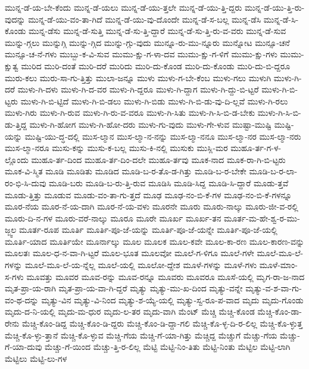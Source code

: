 {ಮುನ್ನ-ಡೆ-ಯ-ಬೇ-ಕೆಂದು
ಮುನ್ನ-ಡೆ-ಯಲು
ಮುನ್ನ-ಡೆ-ಯು-ತ್ತಲೇ
ಮುನ್ನ-ಡೆ-ಯು-ತ್ತಿ-ದ್ದರು
ಮುನ್ನ-ಡೆ-ಯು-ತ್ತಿ-ರು-ವುದನ್ನು
ಮುನ್ನ-ಡೆ-ಯು-ವಂ-ತಾ-ಗಿದೆ
ಮುನ್ನ-ಡೆ-ಯು-ವು-ದೊಂದೇ
ಮುನ್ನ-ಡೆ-ಸ-ಬಲ್ಲ
ಮುನ್ನ-ಡೆಸಿ
ಮುನ್ನ-ಡೆ-ಸಿ-ಕೊಂಡು
ಮುನ್ನ-ಡೆಸು
ಮುನ್ನ-ಡೆ-ಸುತ್ತಿ
ಮುನ್ನ-ಡೆ-ಸು-ತ್ತಿ-ದ್ದಾರೆ
ಮುನ್ನ-ಡೆ-ಸು-ತ್ತಿ-ರು-ವ-ವರು
ಮುನ್ನ-ಡೆ-ಸುವ
ಮುನ್ನು-ಗ್ಗಲು
ಮುನ್ನುಗ್ಗಿ
ಮುನ್ನು-ಗ್ಗಿದ
ಮುನ್ನು-ಗ್ಗು-ವುದು
ಮುನ್ನೂ-ರು-ಮು-ನ್ನೂರು
ಮುನ್ನೋಟ
ಮುನ್ಸೂ-ಚನೆ
ಮುನ್ಸೂ-ಚ-ನೆ-ಗಳು
ಮುಬ್ಬು-ಕ-ವಿ-ಸುವ
ಮುಮು-ಕ್ಷು-ಗ-ಳಾ-ದವ
ಮುಮು-ಕ್ಷು-ಗ-ಳಿಗೆ
ಮುಮು-ಕ್ಷು-ಗಳು
ಮುಮು-ಕ್ಷುತ್ವ
ಮುರಿದ
ಮುರಿ-ದಂತೆ
ಮುರಿ-ದರೆ
ಮುರಿದು
ಮುರಿ-ದು-ಕೊಂಡ
ಮುರಿ-ದು-ಕೊಂಡು
ಮುರಿ-ದು-ಬಿ-ದ್ದರೂ
ಮುರು-ಕಲು
ಮುರು-ಸಾ-ಗು-ತ್ತಿತ್ತು
ಮುಲಾ-ಜನ್ನೂ
ಮುಳು
ಮುಳು-ಗ-ಬೇ-ಕೆಂಬ
ಮುಳು-ಗಲು
ಮುಳುಗಿ
ಮುಳು-ಗಿ-ದರೆ
ಮುಳು-ಗಿ-ದಳು
ಮುಳು-ಗಿ-ದ-ವರ
ಮುಳು-ಗಿ-ದ್ದರೂ
ಮುಳು-ಗಿ-ದ್ದಾಗ
ಮುಳು-ಗಿ-ದ್ದು-ಬಿ-ಟ್ಟರೆ
ಮುಳು-ಗಿ-ಬಿ-ಟ್ಟರು
ಮುಳು-ಗಿ-ಬಿ-ಟ್ಟಿದೆ
ಮುಳು-ಗಿ-ಬಿ-ಡಲು
ಮುಳು-ಗಿ-ಬಿಡು
ಮುಳು-ಗಿ-ಬಿ-ಡು-ವು-ದಿ-ಲ್ಲವೆ
ಮುಳು-ಗಿ-ರಲು
ಮುಳು-ಗಿರು
ಮುಳು-ಗಿ-ರುವ
ಮುಳು-ಗಿ-ರು-ವ-ವರೂ
ಮುಳು-ಗಿ-ಸಿತು
ಮುಳು-ಗಿ-ಸಿ-ಬಿ-ಡ-ಬೇಕು
ಮುಳು-ಗಿ-ಸಿ-ಬಿ-ಡು-ತ್ತಿದ್ದ
ಮುಳು-ಗಿ-ಹೋಗ
ಮುಳು-ಗಿ-ಹೋ-ದರು
ಮುಳು-ಗು-ವುದು
ಮುಳು-ಗೇ-ಳುವ
ಮುಷ್ಟಾ-ಮುಷ್ಟಿ
ಮುಷ್ಟಿ-ಯನ್ನು
ಮುಷ್ಟಿ-ಯು-ದ್ಧ-ದಲ್ಲಿ
ಮುಸ-ಲ್ಮಾನ
ಮುಸ-ಲ್ಮಾ-ನ-ನನ್ನು
ಮುಸ-ಲ್ಮಾ-ನನೂ
ಮುಸ-ಲ್ಮಾ-ನರ
ಮುಸ-ಲ್ಮಾ-ನರು
ಮುಸ-ಲ್ಮಾ-ನರೂ
ಮುಸು-ಕನ್ನು
ಮುಸು-ಕ-ಬಲ್ಲ
ಮುಸು-ಕಿ-ನಲ್ಲಿ
ಮುಸುಕು
ಮುಸ್ಲಿ-ಮರ
ಮುಹೂ-ರ್ತ-ಗ-ಳ-ಲ್ಲೊಂದು
ಮುಹೂ-ರ್ತ-ದಿಂದ
ಮುಹೂ-ರ್ತ-ದಿಂ-ದಲೇ
ಮುಹೂ-ರ್ತವು
ಮೂಕ-ನಾದ
ಮೂಕ-ರಾ-ಗಿ-ಬಿ-ಟ್ಟರು
ಮೂಕ-ವಿ-ಸ್ಮಿತ
ಮೂಡಿ
ಮೂಡಿತು
ಮೂಡಿದ
ಮೂಡಿ-ಬ-ರ-ತೊ-ಡ-ಗಿತ್ತು
ಮೂಡಿ-ಬ-ರ-ಬೇಕೇ
ಮೂಡಿ-ಬ-ರ-ಲಾ-ರಂ-ಭಿ-ಸಿ-ದುವು
ಮೂಡಿ-ಬರು
ಮೂಡಿ-ಬ-ರು-ತ್ತಿ-ರುವ
ಮೂಡಿಸಿ
ಮೂಡಿ-ಸಿದ್ದ
ಮೂಡಿ-ಸಿ-ದ್ದಾರೆ
ಮೂಡು-ತ್ತವೆ
ಮೂಡು-ತ್ತಿತ್ತು
ಮೂಡುವ
ಮೂಡು-ವಂ-ತಾ-ಗು-ತ್ತದೆ
ಮೂಢ
ಮೂಢ-ನಂ-ಬಿ-ಕೆ-ಗಳ
ಮೂಢ-ನಂ-ಬಿ-ಕೆ-ಗಳನ್ನೂ
ಮೂರ-ನೆಯ
ಮೂರ-ನೆ-ಯ-ದಾಗಿ
ಮೂರ-ನೆ-ಯ-ವಳು
ಮೂರನೇ
ಮೂರು
ಮೂರು-ನಾಲ್ಕು
ಮೂರು-ಜೀ-ವ-ರಲ್ಲಿ
ಮೂರು-ದಿ-ನ-ಗಳ
ಮೂರು-ವರೆ-ನಾಲ್ಕು
ಮೂರೂ
ಮೂರೇ
ಮೂರ್ಖ
ಮೂರ್ಖ-ತನ
ಮೂರ್ತ-ಮ-ಹೇ-ಶ್ವ-ರ-ಮು-ಜ್ಜ್ವಲ
ಮೂರ್ತ-ರೂಪ
ಮೂರ್ತಿ
ಮೂರ್ತಿ-ಪೂ-ಜೆ-ಯನ್ನು
ಮೂರ್ತಿ-ಪೂ-ಜೆ-ಯನ್ನೇ
ಮೂರ್ತಿ-ಪೂ-ಜೆ-ಯಲ್ಲಿ
ಮೂರ್ತಿ-ಯಾದ
ಮೂರ್ತಿಯೇ
ಮೂರ್ನಾಲ್ಕು
ಮೂಲ
ಮೂಲಕ
ಮೂಲ-ಕವೇ
ಮೂಲ-ಕಾ-ರಣ
ಮೂಲ-ಕಾರಣ-ವನ್ನು
ಮೂಲತಃ
ಮೂಲ-ಧ-ನ-ವಾ-ಗಿ-ಟ್ಟರೆ
ಮೂಲ-ಭೂತ
ಮೂಲವೋ
ಮೂಲೆ-ಗ-ಳಿಗೂ
ಮೂಲೆ-ಗಳೇ
ಮೂಲೆ-ಮೂ-ಲೆ-ಗಳನ್ನು
ಮೂಲೆ-ಮೂ-ಲೆ-ಯ-ನ್ನೆಲ್ಲ
ಮೂಲೆ-ಯಲ್ಲಿ
ಮೂಲೋ-ದ್ದೇಶ
ಮೂಳೆ-ಗಳನ್ನು
ಮೂಳೆ-ಗಳು
ಮೂಳೆ-ಮಾಂ-ಸ-ಗಳು
ಮೂವತ್ತು
ಮೂವರ
ಮೂವ-ರನ್ನು
ಮೂವ-ರನ್ನೂ
ಮೂವರು
ಮೂವರೂ
ಮೂಸೆ-ಯಲ್ಲಿ
ಮೃಗ-ರಾ-ಜ-ನಾದ
ಮೃತ-ಪ್ರಾ-ಯ-ರಾಗಿ
ಮೃತ-ಪ್ರಾ-ಯ-ವಾ-ಗಿ-ದ್ದರೆ
ಮೃತ್ಯು
ಮೃತ್ಯು-ಮು-ಖ-ದಿಂದ
ಮೃತ್ಯು-ವನ್ನೇ
ಮೃತ್ಯು-ವ-ಶ-ವಾ-ಗು-ವಂ-ಥ-ದನ್ನು
ಮೃತ್ಯು-ವಿನ
ಮೃತ್ಯು-ವಿ-ನಿಂದ
ಮೃತ್ಯು-ಶ-ಯ್ಯೆ-ಯಲ್ಲಿ
ಮೃತ್ಯು-ಸ್ವ-ರೂ-ಪ-ವಾದ
ಮೃದು
ಮೃದು-ಗೊಂಡು
ಮೃದು-ದ-ನಿ-ಯಲ್ಲಿ
ಮೃದು-ಮ-ಧುರ
ಮೃದು-ಲ-ತರ
ಮೃದು-ವಾಗಿ
ಮೆಂಟ್
ಮೆಚ್ಚಿ
ಮೆಚ್ಚಿ-ಕೊಂಡ
ಮೆಚ್ಚಿ-ಕೊಂ-ಡಾ-ರೇನು
ಮೆಚ್ಚಿ-ಕೊಂ-ಡಿದ್ದ
ಮೆಚ್ಚಿ-ಕೊಂ-ಡಿ-ದ್ದರು
ಮೆಚ್ಚಿ-ಕೊಂ-ಡಿ-ದ್ದಾ-ಗಲಿ
ಮೆಚ್ಚಿ-ಕೊ-ಳ್ಳ-ದಿ-ರ-ಲಿಲ್ಲ
ಮೆಚ್ಚಿ-ಕೊ-ಳ್ಳುತ್ತ
ಮೆಚ್ಚಿ-ಕೊ-ಳ್ಳು-ತ್ತಾನೆ
ಮೆಚ್ಚಿ-ಕೊ-ಳ್ಳುವ
ಮೆಚ್ಚಿ-ಗೆಯ
ಮೆಚ್ಚಿ-ಗೆ-ಯಾ-ಗಿತ್ತು
ಮೆಚ್ಚಿದ್ದ
ಮೆಚ್ಚುಗೆ
ಮೆಚ್ಚು-ಗೆಯ
ಮೆಚ್ಚು-ಗೆ-ಯಾ-ದುವು
ಮೆಚ್ಚು-ಗೆ-ಯಿಂದ
ಮೆಚ್ಚು-ತ್ತಿ-ರ-ಲಿಲ್ಲ
ಮೆಟ್ಟಿ
ಮೆಟ್ಟಿ-ನಿಂ-ತಿತು
ಮೆಟ್ಟಿ-ನಿಂತು
ಮೆಟ್ಟಿಲ
ಮೆಟ್ಟಿ-ಲಾಗಿ
ಮೆಟ್ಟಿಲು
ಮೆಟ್ಟಿ-ಲು-ಗಳ
}

